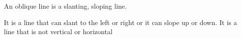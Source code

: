 An oblique line is a slanting, sloping line. 
\par
It is a line that can slant to the left or right or it can slope  up or down.
It is a line that is not vertical or horizontal